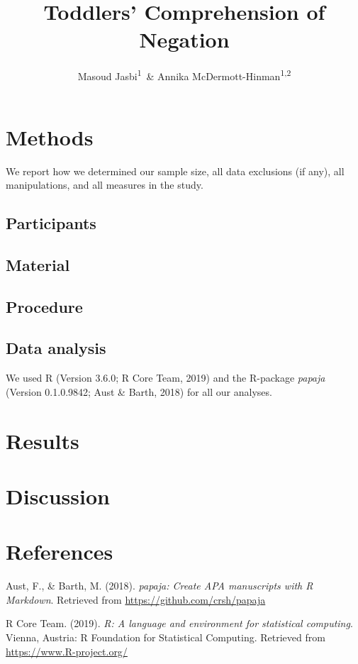 \documentclass[man]{apa6}
\title{Toddlers' Comprehension of Negation}
\author{Masoud Jasbi\textsuperscript{1}~\& Annika McDermott-Hinman\textsuperscript{1,2}}
\date{}
\affiliation{
\vspace{0.5cm}
\textsuperscript{1} Harvard University\\\textsuperscript{2} Brown University}
\begin{document}
\maketitle

\hypertarget{methods}{%
\section{Methods}\label{methods}}

We report how we determined our sample size, all data exclusions (if any), all manipulations, and all measures in the study.

\hypertarget{participants}{%
\subsection{Participants}\label{participants}}

\hypertarget{material}{%
\subsection{Material}\label{material}}

\hypertarget{procedure}{%
\subsection{Procedure}\label{procedure}}

\hypertarget{data-analysis}{%
\subsection{Data analysis}\label{data-analysis}}

We used R (Version 3.6.0; R Core Team, 2019) and the R-package \emph{papaja} (Version 0.1.0.9842; Aust \& Barth, 2018) for all our analyses.

\hypertarget{results}{%
\section{Results}\label{results}}

\hypertarget{discussion}{%
\section{Discussion}\label{discussion}}

\newpage

\hypertarget{references}{%
\section{References}\label{references}}

\begingroup
\setlength{\parindent}{-0.5in}
\setlength{\leftskip}{0.5in}

\hypertarget{refs}{}
\leavevmode\hypertarget{ref-R-papaja}{}%
Aust, F., \& Barth, M. (2018). \emph{papaja: Create APA manuscripts with R Markdown}. Retrieved from \url{https://github.com/crsh/papaja}

\leavevmode\hypertarget{ref-R-base}{}%
R Core Team. (2019). \emph{R: A language and environment for statistical computing}. Vienna, Austria: R Foundation for Statistical Computing. Retrieved from \url{https://www.R-project.org/}

\endgroup
\end{document}
